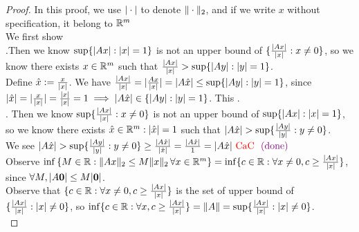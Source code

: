 \documentclass{report}
\begin{document}
\begin{proof}
In this proof, we use $|\cdot|$ to denote $\| \cdot \|_2$, and if we write $x$ without specification, it belong to  $\mathbb{R}^m$\\

We first show \\

.Then we know $ \sup \{ |Ax|:|x|=1 \} $ is not an upper bound of $ \{ \frac{|Ax|}{|x|}:x\neq 0 \} $, so we know there exists $x\in \mathbb{R}^m$ such that $\frac{|Ax|}{|x|}>\sup \{ |Ay|:|y|=1 \}$.\\

Define $\hat{x}:=\frac{x}{|x|}$. We have $\frac{|Ax|}{|x|}=|\frac{Ax}{|x|}|=|A \hat{x}|\leq \sup \{ |Ay|:|y|=1 \}
$, since $|\hat{x}|=|\frac{x}{|x|}|=\frac{|x|}{|x|}=1\implies |A \hat{x}|\in \{ |Ay|:|y|=1 \}$. This \CaC.\\

. Then we know $\sup \{ \frac{|Ax|}{|x|}:x\neq 0 \}$ is not an upper bound of $\sup \{ |Ax|:|x|=1 \}$, so we know there exists $\hat{x} \in \mathbb{R}^m:|\hat{x}|=1$ such that $\abso{A \hat{x}}>\sup \set{\frac{\abso{Ay}}{\abso{y}}:y\neq 0}$.\\

We see $\abso{A \hat{x}}>\sup \set{\frac{\abso{Ay}}{\abso{y}}:y\neq 0}\geq \frac{\abso{A \hat{x}}}{\abso{\hat{x}}}=\frac{\abso{A \hat{x}}}{1}=\abso{A \hat{x}}\tCaC \vdone$\\

Observe $  \inf \left\{ M \in \mathbb{R} : \|Ax\|_2 \leq M \|x\|_2 \, \forall x \in \mathbb{R}^m \right\}= \inf \{ c \in \mathbb{R}: \forall x\neq 0, c\geq \frac{|Ax|}{|x|} \}$, since $\forall M, |A\textbf{0}|\leq M|\textbf{0}|$.\\

Observe that $   \{ c \in \mathbb{R}: \forall x\neq 0, c\geq \frac{|Ax|}{|x|} \}$ is the set of upper bound of $\{ \frac{|Ax|}{|x|}:|x|\neq 0 \}$, so $\inf   \{ c \in \mathbb{R}: \forall x, c\geq \frac{|Ax|}{|x|} \}=\| A \|=\sup \{ \frac{|Ax|}{|x|}:|x|\neq 0 \}$.\\
\end{proof}
\end{document}
